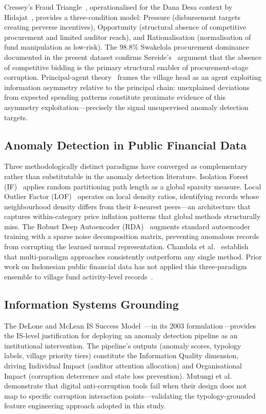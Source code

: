 \documentclass[3p,times,procedia]{elsarticle}
\begin{document}
Cressey's Fraud Triangle~\cite{ref17}, operationalised for the Dana Desa context by Hidajat~\cite{ref6}, provides a three-condition model: Pressure (disbursement targets creating perverse incentives), Opportunity (structural absence of competitive procurement and limited auditor reach), and Rationalisation (normalisation of fund manipulation as low-risk). The 98.8\% Swakelola procurement dominance documented in the present dataset confirms S{\o}reide's~\cite{ref9} argument that the absence of competitive bidding is the primary structural enabler of procurement-stage corruption. Principal-agent theory~\cite{ref26} frames the village head as an agent exploiting information asymmetry relative to the principal chain: unexplained deviations from expected spending patterns constitute proximate evidence of this asymmetry exploitation---precisely the signal unsupervised anomaly detection targets.

\subsection{Anomaly Detection in Public Financial Data}

Three methodologically distinct paradigms have converged as complementary rather than substitutable in the anomaly detection literature. Isolation Forest (IF)~\cite{ref19,ref20} applies random partitioning path length as a global sparsity measure. Local Outlier Factor (LOF)~\cite{ref25} operates on local density ratios, identifying records whose neighbourhood density differs from their $k$-nearest peers---an architecture that captures within-category price inflation patterns that global methods structurally miss. The Robust Deep Autoencoder (RDA)~\cite{ref34} augments standard autoencoder training with a sparse noise decomposition matrix, preventing anomalous records from corrupting the learned normal representation. Chandola et al.~\cite{ref24} establish that multi-paradigm approaches consistently outperform any single method. Prior work on Indonesian public financial data has not applied this three-paradigm ensemble to village fund activity-level records~\cite{ref12,ref16}.

\subsection{Information Systems Grounding}

The DeLone and McLean IS Success Model~\cite{ref10}---in its 2003 formulation---provides the IS-level justification for deploying an anomaly detection pipeline as an institutional intervention. The pipeline's outputs (anomaly scores, typology labels, village priority tiers) constitute the Information Quality dimension, driving Individual Impact (auditor attention allocation) and Organisational Impact (corruption deterrence and state loss prevention). Mutungi et al.~\cite{ref5} demonstrate that digital anti-corruption tools fail when their design does not map to specific corruption interaction points---validating the typology-grounded feature engineering approach adopted in this study.
\end{document}
